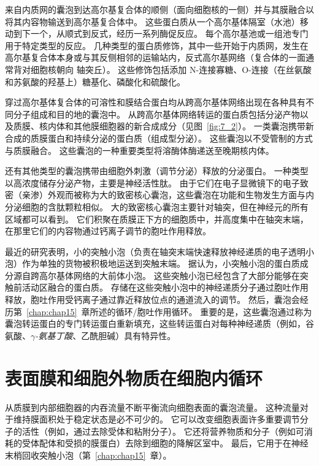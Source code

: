 来自内质网的囊泡到达高尔基复合体的顺侧（面向细胞核的一侧）并与其膜融合以将其内容物输送到高尔基复合体中。
这些蛋白质从一个高尔基体隔室（水池）移动到下一个，从顺式到反式，经历一系列酶促反应。
每个高尔基池或一组池专门用于特定类型的反应。
几种类型的蛋白质修饰，其中一些开始于内质网，发生在高尔基复合体本身或与其反侧相邻的运输站内，反式高尔基网络（复合体的一面通常背对细胞核朝向 轴突丘）。
这些修饰包括添加 N-连接寡糖、O-连接（在丝氨酸和苏氨酸的羟基上）糖基化、磷酸化和硫酸化。


穿过高尔基体复合体的可溶性和膜结合蛋白均从跨高尔基体网络出现在各种具有不同分子组成和目的地的囊泡中。 
从跨高尔基体网络转运的蛋白质包括分泌产物以及质膜、核内体和其他膜细胞器的新合成成分（见图~\ref{fig:7_2}）。
一类囊泡携带新合成的质膜蛋白和持续分泌的蛋白质（组成型分泌）。
这些囊泡以不受管制的方式与质膜融合。
这些囊泡的一种重要类型将溶酶体酶递送至晚期核内体。


还有其他类型的囊泡携带由细胞外刺激（调节分泌）释放的分泌蛋白。
一种类型以高浓度储存分泌产物，主要是神经活性肽。
由于它们在电子显微镜下的电子致密（亲渗）外观而被称为大的致密核心囊泡，这些囊泡在功能和生物发生方面与内分泌细胞的含肽颗粒相似。
大的致密核心囊泡主要针对轴突，但在神经元的所有区域都可以看到。
它们积聚在质膜正下方的细胞质中，并高度集中在轴突末端，在那里它们的内容物通过钙离子调节的胞吐作用释放。


最近的研究表明，小的突触小泡（负责在轴突末端快速释放神经递质的电子透明小泡）作为单独的货物被积极地运送到突触末端。
据认为，小突触小泡的蛋白质成分源自跨高尔基体网络的大前体小泡。
这些突触小泡已经包含了大部分能够在突触前活动区融合的蛋白质。
存储在这些突触小泡中的神经递质分子通过胞吐作用释放，胞吐作用受钙离子通过靠近释放位点的通道流入的调节。
然后，囊泡会经历第~\ref{chap:chap15}~章所述的循环/胞吐作用循环。
重要的是，这些囊泡通过称为囊泡转运蛋白的专门转运蛋白重新填充，这些转运蛋白对每种神经递质（例如，谷氨酸、\textit{$\gamma$-氨基丁酸}、乙酰胆碱）具有特异性。



\section{表面膜和细胞外物质在细胞内循环}

从质膜到内部细胞器的内吞流量不断平衡流向细胞表面的囊泡流量。
这种流量对于维持膜面积处于稳定状态是必不可少的。
它可以改变细胞表面许多重要调节分子的活性（例如，通过去除受体和粘附分子）。
它还将营养物质和分子（例如可消耗的受体配体和受损的膜蛋白）去除到细胞的降解区室中。
最后，它用于在神经末梢回收突触小泡（第~\ref{chap:chap15}~章）。


